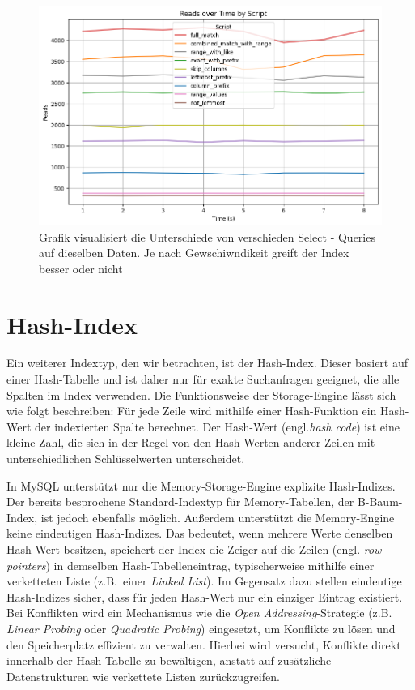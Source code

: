 \begin{figure}[!ht]
    \centering
    \includegraphics[width=.8\textwidth]{PNGs/Script/Index/B_Tree/b-tree-query-differences/Reads}
    \caption[B - Tree - Selects - Ergebnis]{Grafik visualisiert die Unterschiede von verschieden Select - Queries auf dieselben Daten. Je nach Gewschiwndikeit greift der Index besser oder nicht }
    \label{fig:b-tree-query-reads}
\end{figure}

\section{Hash-Index}\label{sec:indexing-hash-index}
Ein weiterer Indextyp, den wir betrachten, ist der Hash-Index.
Dieser basiert auf einer Hash-Tabelle und ist daher nur für exakte Suchanfragen geeignet, die alle Spalten im Index verwenden.
Die Funktionsweise der Storage-Engine lässt sich wie folgt beschreiben: Für jede Zeile wird mithilfe einer Hash-Funktion ein Hash-Wert der indexierten Spalte berechnet.
Der Hash-Wert (engl.\textit{hash code}) ist eine kleine Zahl, die sich in der Regel von den Hash-Werten anderer Zeilen mit unterschiedlichen Schlüsselwerten unterscheidet.

In MySQL unterstützt nur die Memory-Storage-Engine explizite Hash-Indizes.
Der bereits besprochene Standard-Indextyp für Memory-Tabellen, der B-Baum-Index, ist jedoch ebenfalls möglich.
Außerdem unterstützt die Memory-Engine keine eindeutigen Hash-Indizes.
Das bedeutet, wenn mehrere Werte denselben Hash-Wert besitzen, speichert der Index die Zeiger auf die Zeilen (engl. \textit{row pointers}) in demselben Hash-Tabelleneintrag, typischerweise mithilfe einer verketteten Liste (z.B.\ einer \textit{Linked List}).
Im Gegensatz dazu stellen eindeutige Hash-Indizes sicher, dass für jeden Hash-Wert nur ein einziger Eintrag existiert.
Bei Konflikten wird ein Mechanismus wie die \textit{Open Addressing}-Strategie (z.B. \textit{Linear Probing} oder \textit{Quadratic Probing}) eingesetzt, um Konflikte zu lösen und den Speicherplatz effizient zu verwalten.
Hierbei wird versucht, Konflikte direkt innerhalb der Hash-Tabelle zu bewältigen, anstatt auf zusätzliche Datenstrukturen wie verkettete Listen zurückzugreifen.

